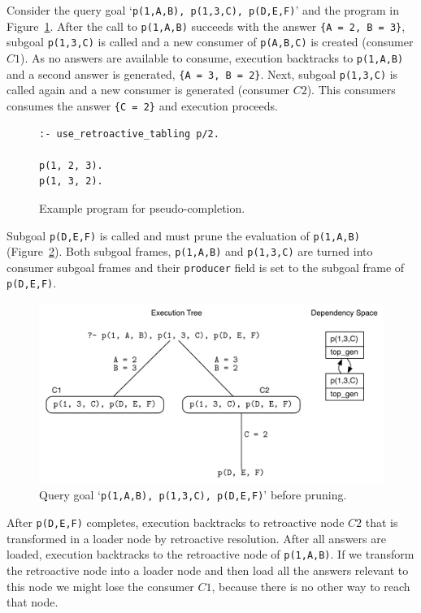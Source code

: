 Consider the query goal `\texttt{p(1,A,B),~p(1,3,C),~p(D,E,F)}' and the program in Figure~\ref{fig:retro_ignored_consumer}. After the call to \texttt{p(1,A,B)} succeeds with the
answer \texttt{\{A~=~2,~B~=~3\}}, subgoal \texttt{p(1,3,C)} is called and a new consumer of
\texttt{p(A,B,C)} is created (consumer $C1$). As no answers are available to consume, execution
backtracks to \texttt{p(1,A,B)} and a second answer is generated, \texttt{\{A~=~3,~B~=~2\}}. Next,
subgoal \texttt{p(1,3,C)} is called again and a new consumer is generated (consumer $C2$).
This consumers consumes the answer \texttt{\{C~=~2\}} and execution proceeds. 

\begin{figure}[ht]
\begin{Verbatim}
:- use_retroactive_tabling p/2.

p(1, 2, 3).
p(1, 3, 2).
\end{Verbatim}
\caption{Example program for pseudo-completion.}
\label{fig:retro_ignored_consumer}
\end{figure}

Subgoal \texttt{p(D,E,F)} is called and must prune the evaluation of \texttt{p(1,A,B)} 
(Figure~\ref{fig:retro_pseudo_completion1}). Both subgoal frames, \texttt{p(1,A,B)} and \texttt{p(1,3,C)}
are turned into consumer subgoal frames and their \texttt{producer} field is set to the subgoal
frame of \texttt{p(D,E,F)}.

\begin{figure}[ht]
  \centering
    \includegraphics[scale=0.6]{retro_pseudo_completion1.pdf}
  \caption{Query goal `\texttt{p(1,A,B),~p(1,3,C),~p(D,E,F)}' before pruning.}
  \label{fig:retro_pseudo_completion1}
\end{figure}

After \texttt{p(D,E,F)} completes, execution backtracks to retroactive node $C2$ that is transformed
in a loader node by retroactive resolution. After all answers are loaded, execution backtracks to
the retroactive node of \texttt{p(1,A,B)}. If we transform the retroactive node into a loader node and
then load all the answers relevant to this node we might lose the consumer $C1$, because there is no
other way to reach that node.

